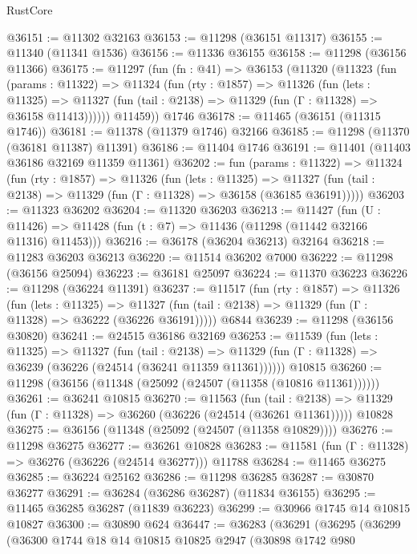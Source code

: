 \begin{lexlean}{RustCore}
\begin{coremodule}
@36151 := @11302 @32163
@36153 := @11298 (@36151 @11317)
@36155 := @11340 (@11341 @1536)
@36156 := @11336 @36155
@36158 := @11298 (@36156 @11366)
@36175 := @11297
    (fun (fn : @41) =>
    @36153
      (@11320
        (@11323
          (fun (params : @11322) =>
          @11324
            (fun (rty : @1857) =>
            @11326
              (fun (lets : @11325) =>
              @11327 (fun (tail : @2138) => @11329 (fun (Γ : @11328) => @36158 @11413))))))
        @11459))
    @1746
@36178 := @11465 (@36151 (@11315 @1746))
@36181 := @11378 (@11379 @1746) @32166
@36185 := @11298 (@11370 (@36181 @11387) @11391)
@36186 := @11404 @1746
@36191 := @11401 (@11403 @36186 @32169 @11359 @11361)
@36202 := fun (params : @11322) =>
  @11324
    (fun (rty : @1857) =>
    @11326
      (fun (lets : @11325) =>
      @11327 (fun (tail : @2138) => @11329 (fun (Γ : @11328) => @36158 (@36185 @36191)))))
@36203 := @11323 @36202
@36204 := @11320 @36203
@36213 := @11427
    (fun (U : @11426) => @11428 (fun (t : @7) => @11436 (@11298 (@11442 @32166 @11316) @11453)))
@36216 := @36178 (@36204 @36213) @32164
@36218 := @11283 @36203 @36213
@36220 := @11514 @36202 @7000
@36222 := @11298 (@36156 @25094)
@36223 := @36181 @25097
@36224 := @11370 @36223
@36226 := @11298 (@36224 @11391)
@36237 := @11517
    (fun (rty : @1857) =>
    @11326
      (fun (lets : @11325) =>
      @11327 (fun (tail : @2138) => @11329 (fun (Γ : @11328) => @36222 (@36226 @36191)))))
    @6844
@36239 := @11298 (@36156 @30820)
@36241 := @24515 @36186 @32169
@36253 := @11539
    (fun (lets : @11325) =>
    @11327
      (fun (tail : @2138) =>
      @11329 (fun (Γ : @11328) => @36239 (@36226 (@24514 (@36241 @11359 @11361))))))
    @10815
@36260 := @11298 (@36156 (@11348 (@25092 (@24507 (@11358 (@10816 @11361))))))
@36261 := @36241 @10815
@36270 := @11563
    (fun (tail : @2138) => @11329 (fun (Γ : @11328) => @36260 (@36226 (@24514 (@36261 @11361)))))
    @10828
@36275 := @36156 (@11348 (@25092 (@24507 (@11358 @10829))))
@36276 := @11298 @36275
@36277 := @36261 @10828
@36283 := @11581 (fun (Γ : @11328) => @36276 (@36226 (@24514 @36277))) @11788
@36284 := @11465 @36275
@36285 := @36224 @25162
@36286 := @11298 @36285
@36287 := @30870 @36277
@36291 := @36284 (@36286 @36287) (@11834 @36155)
@36295 := @11465 @36285 @36287 (@11839 @36223)
@36299 := @30966 @1745 @14 @10815 @10827
@36300 := @30890 @624
@36447 := @36283
    (@36291
      (@36295
        (@36299
          (@36300
            @1744
            @18
            @14
            @10815
            @10825
            @2947
            (@30898
              @1742
              @980

\end{coremodule}
\end{lexlean}
